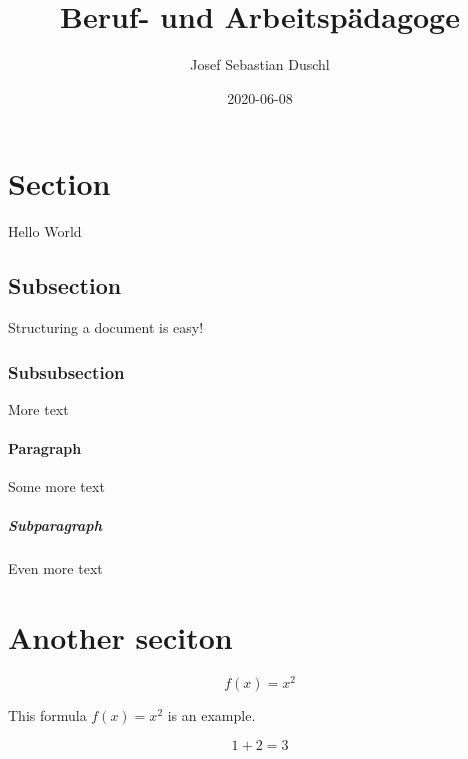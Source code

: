\documentclass{article}
\title{Beruf- und Arbeitspädagoge}
\date{2020-06-08}
\author{Josef Sebastian Duschl}
\begin{document}


    \maketitle
    \newpage

    \tableofcontents %
    \newpage

    \section{Section}
        Hello World

    \subsection{Subsection}
        Structuring a document is easy!

    \subsubsection{Subsubsection}
        More text

    \paragraph{Paragraph}
        Some more text

    \subparagraph{Subparagraph}
        Even more text

    \section{Another seciton}

\begin{equation*}
    f(x) = x^2
\end{equation*}

This formula $f(x) = x^2$ is an example.

\begin{equation*}
    1 + 2 = 3
\end{equation*}
\end{document}
